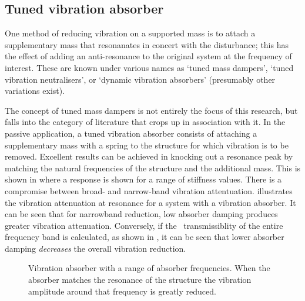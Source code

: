 \subsection{Tuned vibration absorber}

One method of reducing vibration on a supported mass is to attach a
supplementary mass that resonanates in concert with the disturbance; this has
the effect of adding an anti-resonance to the original system at the frequency
of interest. These are known under various names as `tuned mass dampers',
`tuned vibration neutralisers', or `dynamic vibration absorbers' (presumably
other variations exist).

The concept of tuned mass dampers is not entirely the focus of this research,
but falls into the category of literature that crops up in association with
it. In the passive application, a tuned vibration absorber consists of
attaching a supplementary mass with a spring to the structure for which
vibration is to be removed. Excellent results can be achieved in knocking out
a resonance peak by matching the natural frequencies of the structure and the
additional mass. This is shown in  where a response
is shown for a range of stiffness values. There is a compromise between broad-
and narrow-band vibration attentuation. 
illustrates the vibration attenuation at resonance for a system with a
vibration absorber. It can be seen that for narrowband reduction, low absorber
damping produces greater vibration attenuation. Conversely, if the \RMS\
transmissiblity of the entire frequency band is calculated, as shown in
\figref{rms-inertial}, it can be seen that lower absorber damping
\emph{decreases} the overall vibration reduction.

\begin{figure}
   \caption{Vibration absorber with a range of absorber frequencies. 
   When the absorber matches the resonance of the structure the vibration 
   amplitude around that frequency is greatly reduced.}
\end{figure}

